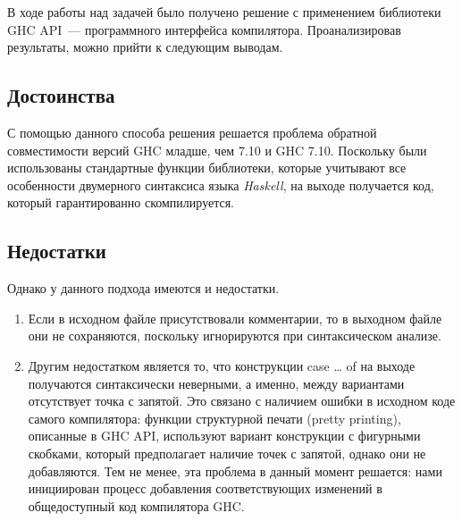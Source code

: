 \Conc
В ходе работы над задачей было получено решение с применением библиотеки GHC API~--- программного интерфейса компилятора. Проанализировав результаты, можно прийти к следующим выводам.
\subsection*{Достоинства}
С помощью данного способа решения решается проблема обратной совместимости версий GHC младше, чем 7.10 и GHC 7.10. Поскольку были использованы стандартные функции библиотеки, которые учитывают все особенности двумерного синтаксиса языка \textit{Haskell}, на выходе получается код, который гарантированно скомпилируется.
\subsection*{Недостатки}
Однако у данного подхода имеются и недостатки.
\begin{enumerate}
\item Если в исходном файле присутствовали комментарии, то в выходном файле они не сохраняются, поскольку игнорируются при синтаксическом анализе.
\item Другим недостатком является то, что конструкции case … of на выходе получаются синтаксически неверными, а именно, между вариантами отсутствует точка с запятой. Это связано с наличием ошибки в исходном коде самого компилятора: функции структурной печати (pretty printing), описанные в GHC API, используют вариант конструкции с фигурными скобками, который предполагает наличие точек с запятой, однако они не добавляются. Тем не менее, эта проблема в данный момент решается: нами инициирован процесс добавления соответствующих изменений в общедоступный код компилятора GHC.
\end{enumerate}

\printbibliography[%
    heading=bibintoc%
]





